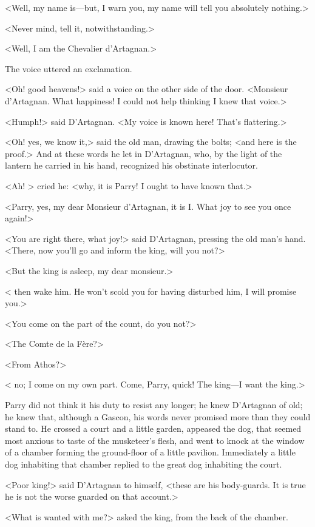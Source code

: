 <Well, my name is—but, I warn you, my name will tell you absolutely nothing.>

<Never mind, tell it, notwithstanding.>

<Well, I am the Chevalier d'Artagnan.>

The voice uttered an exclamation.

<Oh! good heavens!> said a voice on the other side of the door. <Monsieur d'Artagnan. What happiness! I could not help thinking I knew that voice.>

<Humph!> said D'Artagnan. <My voice is known here! That's flattering.>

<Oh! yes, we know it,> said the old man, drawing the bolts; <and here is the proof.> And at these words he let in D'Artagnan, who, by the light of the lantern he carried in his hand, recognized his obstinate interlocutor.

<Ah! > cried he: <why, it is Parry! I ought to have known that.>

<Parry, yes, my dear Monsieur d'Artagnan, it is I\@. What joy to see you once again!>

<You are right there, what joy!> said D'Artagnan, pressing the old man's hand. <There, now you'll go and inform the king, will you not?>

<But the king is asleep, my dear monsieur.>

< then wake him. He won't scold you for having disturbed him, I will promise you.>

<You come on the part of the count, do you not?>

<The Comte de la Fère?>

<From Athos?>

< no; I come on my own part. Come, Parry, quick! The king—I want the king.>

Parry did not think it his duty to resist any longer; he knew D'Artagnan of old; he knew that, although a Gascon, his words never promised more than they could stand to. He crossed a court and a little garden, appeased the dog, that seemed most anxious to taste of the musketeer's flesh, and went to knock at the window of a chamber forming the ground-floor of a little pavilion. Immediately a little dog inhabiting that chamber replied to the great dog inhabiting the court.

<Poor king!> said D'Artagnan to himself, <these are his body-guards. It is true he is not the worse guarded on that account.>

<What is wanted with me?> asked the king, from the back of the chamber.


